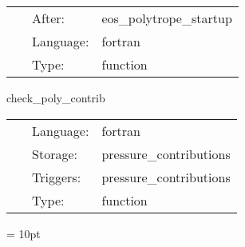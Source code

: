 \hspace{5mm}{\it setup the eos used by dimmelmeier et al. in core collapse } 


\hspace{5mm}

 \begin{tabular*}{160mm}{cll} 
~ & After:  & eos\_polytrope\_startup \\ 
~ & Language:  & fortran \\ 
~ & Type:  & function \\ 
\end{tabular*} 


\vspace{5mm}


\hspace{5mm} check\_poly\_contrib 

\hspace{5mm}{\it output the polytropic and thermal contributions } 


\hspace{5mm}

 \begin{tabular*}{160mm}{cll} 
~ & Language:  & fortran \\ 
~ & Storage:  & pressure\_contributions \\ 
~ & Triggers:  & pressure\_contributions \\ 
~ & Type:  & function \\ 
\end{tabular*} 



\vspace{5mm}\parskip = 10pt 

